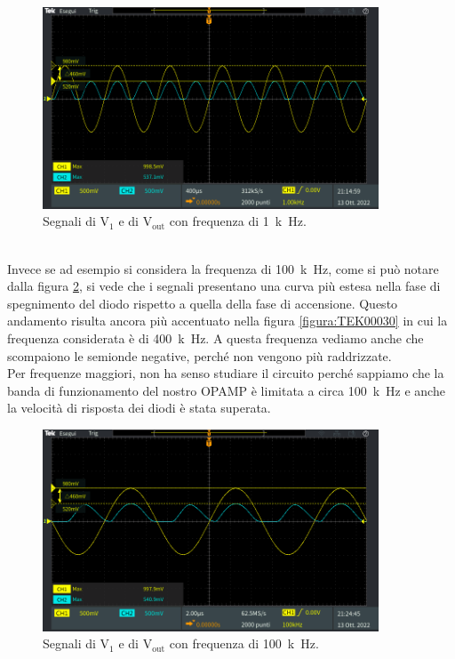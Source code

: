 \documentclass{report}
\begin{document}
\begin{figure}[h!]
	\centering
	\includegraphics[height=6cm]{immagini/TEK00022}
	\caption{Segnali di $\mathrm{V_1}$ e di $\mathrm{V_{out}}$ con frequenza di \SI{1}{k\hertz}.}
	\label{figura:TEK00022}
\end{figure}
\\Invece se ad esempio si considera la frequenza di \SI{100}{k\hertz}, come si può notare dalla figura \ref{figura:TEK00025}, si vede che i segnali presentano una curva più estesa nella fase di spegnimento del diodo rispetto a quella della fase di accensione. Questo andamento risulta ancora più accentuato nella figura \ref{figura:TEK00030} in cui la frequenza considerata è di \SI{400}{k\hertz}. A questa frequenza vediamo anche che scompaiono le semionde negative, perché non vengono più raddrizzate.
\\Per frequenze maggiori, non ha senso studiare il circuito perché sappiamo che la banda di funzionamento del nostro OPAMP è limitata a circa \SI{100}{k\hertz} e anche la velocità di risposta dei diodi è stata superata.
\begin{figure}[h!]
	\centering
	\includegraphics[height=6cm]{immagini/TEK00025}
	\caption{Segnali di $\mathrm{V_1}$ e di $\mathrm{V_{out}}$ con frequenza di \SI{100}{k\hertz}.}
	\label{figura:TEK00025}
\end{figure} 
\end{document}
